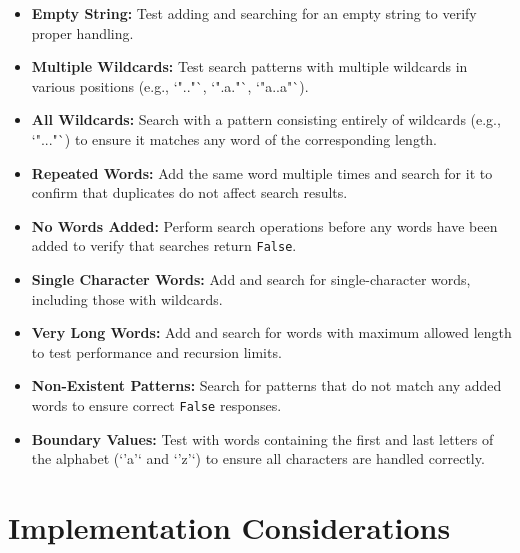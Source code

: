 \begin{itemize}
    \item \textbf{Empty String:}  
    Test adding and searching for an empty string to verify proper handling.
    
    \item \textbf{Multiple Wildcards:}  
    Test search patterns with multiple wildcards in various positions (e.g., `".."`, `".a."`, `"a..a"`).
    
    \item \textbf{All Wildcards:}  
    Search with a pattern consisting entirely of wildcards (e.g., `"..."`) to ensure it matches any word of the corresponding length.
    
    \item \textbf{Repeated Words:}  
    Add the same word multiple times and search for it to confirm that duplicates do not affect search results.
    
    \item \textbf{No Words Added:}  
    Perform search operations before any words have been added to verify that searches return \texttt{False}.
    
    \item \textbf{Single Character Words:}  
    Add and search for single-character words, including those with wildcards.
    
    \item \textbf{Very Long Words:}  
    Add and search for words with maximum allowed length to test performance and recursion limits.
    
    \item \textbf{Non-Existent Patterns:}  
    Search for patterns that do not match any added words to ensure correct \texttt{False} responses.
    
    \item \textbf{Boundary Values:}  
    Test with words containing the first and last letters of the alphabet (`'a'` and `'z'`) to ensure all characters are handled correctly.
\end{itemize}

\section*{Implementation Considerations}

